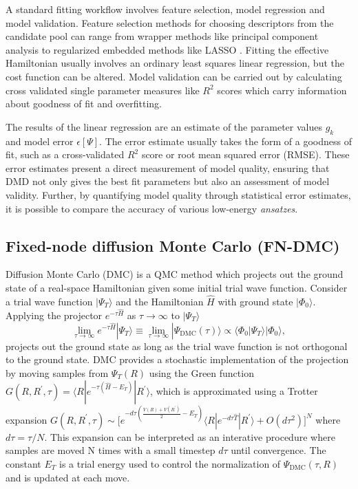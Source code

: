 \documentclass[12pt]{article}
\begin{document}
A standard fitting workflow involves feature selection, model regression and model validation.
Feature selection methods for choosing descriptors from the candidate pool can range from wrapper methods like principal component analysis \cite{pearson_karl_1901_1430636} to regularized embedded methods like LASSO \cite{10.2307/2346178}. 
Fitting the effective Hamiltonian usually involves an ordinary least squares linear regression, but the cost function can be altered.
Model validation can be carried out by calculating cross validated single parameter measures like $R^2$ scores which carry information about goodness of fit and overfitting.

The results of the linear regression are an estimate of the parameter values $g_k$ and model error $\epsilon[\Psi]$.
The error estimate usually takes the form of a goodness of fit, such as a cross-validated $R^2$ score or root mean squared error (RMSE).
These error estimates present a direct measurement of model quality, ensuring that DMD not only gives the best fit parameters but also an assessment of model validity.
Further, by quantifying model quality through statistical error estimates, it is possible to compare the accuracy of various low-energy \textit{ansatzes}.

\subsection{Fixed-node diffusion Monte Carlo (FN-DMC)}
Diffusion Monte Carlo (DMC) is a QMC method which projects out the ground state of a real-space Hamiltonian given some initial trial wave function.
Consider a trial wave function $|\Psi_T\rangle$ and the Hamiltonian $\hat{H}$ with ground state $|\Phi_0\rangle$. 
Applying the projector $e^{-\tau \hat{H}}$ as $\tau \rightarrow \infty$ to $|\Psi_T \rangle$
\begin{equation}
\lim_{\tau \rightarrow \infty} e^{-\tau \hat{H}} |\Psi_T\rangle 
\equiv \lim_{\tau \rightarrow \infty} |\Psi_\text{DMC}(\tau)\rangle \propto \langle \Phi_0|\Psi_T\rangle |\Phi_0\rangle,
\end{equation}
projects out the ground state as long as the trial wave function is not orthogonal to the ground state. 
DMC provides a stochastic implementation of the projection by moving samples from $\Psi_T(R)$ using the Green function $G(R, R^\prime, \tau) = \langle R | e^{-\tau(\hat{H} - E_T)} | R^\prime \rangle$, which is approximated using a Trotter expansion $G(R, R^\prime, \tau) \sim \Big[e^{-d\tau(\frac{V(R) + V(R^\prime)}{2} - E_T)} \langle R| e^{-d\tau\hat{T}}|R^\prime \rangle + O(d\tau^2) \Big]^N $ 
where $d\tau = \tau/N$.
This expansion can be interpreted as an interative procedure where samples are moved N times with a small timestep $d\tau$ until convergence.
The constant $E_T$ is a trial energy used to control the normalization of $\Psi_\text{DMC}(\tau, R)$ and is updated at each move.
\end{document}
